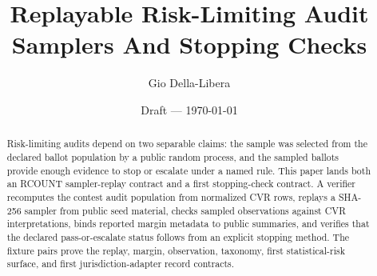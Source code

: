 \documentclass[12pt]{article}
\title{Replayable Risk-Limiting Audit Samplers And Stopping Checks}
\author{Gio Della-Libera}
\date{Draft --- \today}
\begin{document}
\maketitle

\begin{abstract}
Risk-limiting audits depend on two separable claims: the sample was selected
from the declared ballot population by a public random process, and the sampled
ballots provide enough evidence to stop or escalate under a named rule. This
paper lands both an RCOUNT sampler-replay contract and a first stopping-check
contract. A verifier recomputes the contest audit population from normalized
CVR rows, replays a SHA-256 sampler from public seed material, checks sampled
observations against CVR interpretations, binds reported margin metadata to
public summaries, and verifies that the declared pass-or-escalate status
follows from an explicit stopping method. The fixture pairs prove the replay,
margin, observation, taxonomy, first statistical-risk surface, and first
jurisdiction-adapter record contracts.
\end{abstract}








\nocite{rcount-overview-2026,rcount-v5-2026,rcount-v6-2026}


\end{document}
